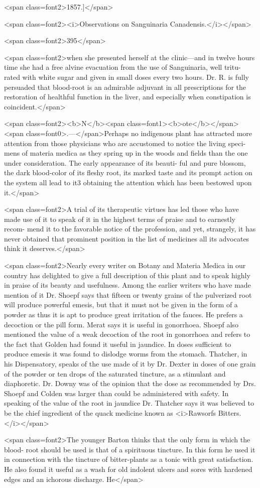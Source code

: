 <span class=font2>1857.]</span>

<span class=font2><i>Observations on Sanguinaria Canadensis.</i></span>

<span class=font2>395</span>

<span class=font2>when she presented herself at the clinic—and in twelve hours time
she had a free alvine evacuation from the use of Sanguinaria, well tritu-
rated with white sugar and given in small doses every two hours.
Dr. R. is fully persuaded that blood-root is an admirable adjuvant in
all prescriptions for the restoration of healthful function in the liver,
and especially when constipation is coincident.</span>

<span class=font2><b>N</b><span class=font1><b>ote</b></span><span class=font0>.—</span>Perhaps no indigenous plant has attracted more attention
from those physicians who are accustomed to notice the living speci-
mens of materia medica as they spring up in the woods and fields
than the one under consideration. The early appearance of its beauti-
ful and pure blossom, the dark blood-color of its fleshy root, its marked
taste and its prompt action on the system all lead to it3 obtaining the
attention which has been bestowed upon it.</span>

<span class=font2>A trial of its therapeutic virtues has led those who have made use of
it to speak of it in the highest terms of praise and to earnestly recom-
mend it to the favorable notice of the profession, and yet, strangely, it
has never obtained that prominent position in the list of medicines all
its advocates think it deserves.</span>

<span class=font2>Nearly every writer on Botany and Materia Medica in our country
has delighted to give a full description of this plant and to speak highly
in praise of its beauty and usefulness. Among the earlier writers who
have made mention of it Dr. Shoepf says that fifteen or twenty grains
of the pulverized root will produce powerful emesis, but that it must not be
given in the form of a powder as thus it is apt to produce great irritation
of the fauces. He prefers a decoction or the pill form. Merat says it
is useful in gonorrhoea. Shoepf also mentioned the value of a weak
decoction of the root in gonorrhoea and refers to the fact that Golden
had found it useful in jaundice. In doses sufficient to produce emesis
it was found to dislodge worms from the stomach. Thatcher, in his
Dispensatory, speaks of the use made of it by Dr. Dexter in doses of
one grain of the powder or ten drops of the saturated tincture, as a
stimulant and diaphoretic. Dr. Downy was of the opinion that the
dose as recommended by Drs. Shoepf and Colden was larger than could
be administered with safety. In speaking of the value of the root in
jaundice Dr. Thatcher says it was believed to be the chief ingredient
of the quack medicine known as <i>Rawsorfs Bitters.</i></span>

<span class=font2>The younger Barton thinks that the only form in which the blood-
root should be used is that of a spirituous tincture. In this form he
used it in connection with the tincture of bitter-plants as a tonic with
great satisfaction. He also found it useful as a wash for old indolent
ulcers and sores with hardened edges and an ichorous discharge. He</span>
\endinput